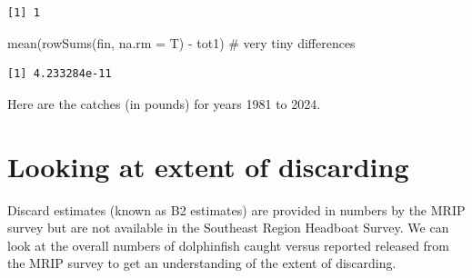 \documentclass[
  letterpaper,
  oneside,
  open=any]{scrbook}
\newenvironment{Shaded}{\begin{snugshade}}{\end{snugshade}}
\newcommand{\AttributeTok}[1]{\textcolor[rgb]{0.40,0.45,0.13}{#1}}
\newcommand{\CommentTok}[1]{\textcolor[rgb]{0.37,0.37,0.37}{#1}}
\newcommand{\FunctionTok}[1]{\textcolor[rgb]{0.28,0.35,0.67}{#1}}
\newcommand{\NormalTok}[1]{\textcolor[rgb]{0.00,0.23,0.31}{#1}}
\newcommand{\SpecialCharTok}[1]{\textcolor[rgb]{0.37,0.37,0.37}{#1}}
\begin{document}
\begin{verbatim}
[1] 1
\end{verbatim}

\begin{Shaded}
\begin{Highlighting}[]
\FunctionTok{mean}\NormalTok{(}\FunctionTok{rowSums}\NormalTok{(fin, }\AttributeTok{na.rm =}\NormalTok{ T) }\SpecialCharTok{{-}}\NormalTok{ tot1)   }\CommentTok{\# very tiny differences}
\end{Highlighting}
\end{Shaded}

\begin{verbatim}
[1] 4.233284e-11
\end{verbatim}

Here are the catches (in pounds) for years 1981 to 2024.

\section{Looking at extent of
discarding}\label{looking-at-extent-of-discarding}

Discard estimates (known as B2 estimates) are provided in numbers by the
MRIP survey but are not available in the Southeast Region Headboat
Survey. We can look at the overall numbers of dolphinfish caught versus
reported released from the MRIP survey to get an understanding of the
extent of discarding.
\end{document}

